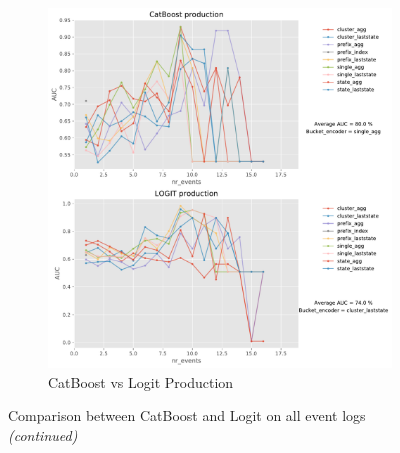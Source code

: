 \documentclass[twoside,11pt]{Latex/Classes/PhDthesisPSnPDF}
\begin{document}
\begin{figure}[t!]
	\begin{subfigure}{0.48\textwidth}
		\includegraphics[width=\linewidth]{images/catboost/graphslogit/production_CatBoost_logit.pdf}
		\caption{CatBoost vs Logit Production} \label{fig:procl}
	\end{subfigure}\hspace*{\fill}
	\caption{Comparison between CatBoost and Logit on all event logs \textit{(continued)}}
	\label{fig:r3cl}
\end{figure}	



\end{document}
